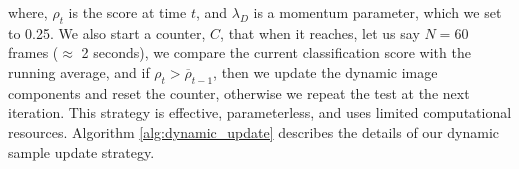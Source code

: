 where, ${\rho}_t$ is the score at time $t$, and ${\lambda}_{D}$ is a momentum parameter, which we set to 0.25. We also start a counter, $C$, that when it reaches, let us say $N=60$ frames ($\approx$ 2 seconds), we compare the current classification score with the running average, and if ${\rho}_t > \overline{\rho }_{t-1}$, then we update the dynamic image components and reset the counter, otherwise we repeat the test at the next iteration. This strategy is effective, parameterless, and uses limited computational resources. Algorithm \ref{alg:dynamic_update} describes the details of our dynamic sample update strategy.




